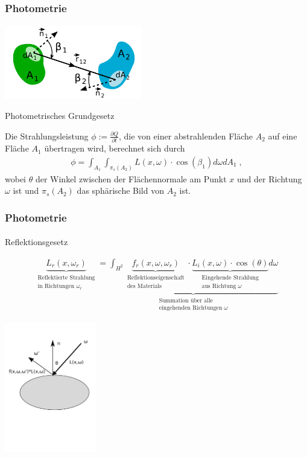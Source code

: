 \documentclass{beamer}
\begin{document}
\begin{frame}
    \frametitle{Photometrie}
\framesubtitle{}
  \begin{center}

    \includegraphics[width=0.45\textwidth]{images/Fotometrisches_Grundgesetz_Schema.png}
\end{center}


\begin{block}{Photometrisches Grundgesetz}


Die Strahlungsleistung $\phi:= \frac{ \partial Q}{\partial t}$, die von einer abstrahlenden Fläche $A_2$  auf eine Fläche $A_1$ übertragen wird, berechnet sich durch
\begin{align}
\phi = \int_{A_1} \int_{\pi_s(A_2)} L(x, \omega)\cdot \cos(\beta_1) d\omega  dA_1   \; ,
\end{align}
wobei $\theta$ der Winkel zwischen der Flächennormale am Punkt $x$ und der Richtung $\omega$ ist und $\pi_s(A_2)$ das sphärische Bild von $A_2$ ist.
\end{block}
\end{frame}


\begin{frame}
    \frametitle{Photometrie}
\framesubtitle{}
\begin{block}{Reflektionsgesetz}

\begin{align*}
\underbrace{L_r(x, \omega_r)}_{\substack{\text{Reflektierte Strahlung} \\ \text{in Richtungen $\omega_r$}}} =\underbrace{\int_{H^2} \underbrace{f_r (x, \omega, \omega_r)}_{\substack{\text{Reflektionseigenschaft} \\ \text{des Materials}}} \cdot  \underbrace{L_i(x, \omega) \cdot  \cos(\theta) }_{\substack{\text{Eingehende Strahlung} \\ \text{aus Richtung $\omega$}}} d\omega}_{\substack{\text{Summation über  alle } \\ \text{eingehenden Richtungen $\omega$}}} 
\end{align*}
  \begin{center}
    \includegraphics[width=0.3\textwidth]{images/brdf.png}
\end{center}
\end{block}
\end{frame}
\end{document}
